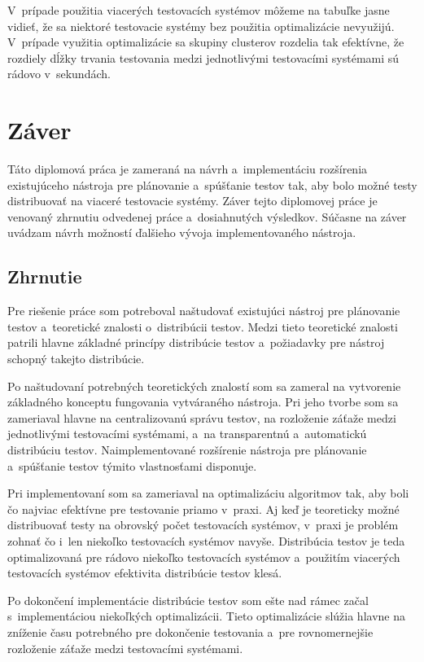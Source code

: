 V~prípade použitia viacerých testovacích systémov môžeme na tabuľke jasne vidieť,
že sa niektoré testovacie systémy bez použitia optimalizácie nevyužijú. 
V~prípade využitia optimalizácie sa skupiny clusterov rozdelia tak efektívne,
že rozdiely dĺžky trvania testovania medzi jednotlivými testovacími systémami 
sú rádovo v~sekundách.


%
%
\chapter{Záver}
\label{kapitola:zaver}
Táto diplomová práca je zameraná na návrh a~implementáciu rozšírenia
existujúceho nástroja pre plánovanie a~spúšťanie testov tak, aby bolo
možné testy distribuovať na viaceré testovacie systémy. 
Záver tejto diplomovej práce je venovaný zhrnutiu odvedenej práce 
a~dosiahnutých výsledkov. Súčasne na záver uvádzam návrh možností ďalšieho
vývoja implementovaného nástroja.

\section{Zhrnutie}
\label{sekcia:zhrnutie}
Pre riešenie práce som potreboval naštudovať existujúci nástroj pre 
plánovanie testov a~teoretické znalosti o~distribúcii testov.
Medzi tieto teoretické znalosti patrili hlavne základné princípy 
distribúcie testov a~požiadavky pre nástroj schopný takejto distribúcie.

Po naštudovaní potrebných teoretických znalostí som sa zameral na vytvorenie
základného konceptu fungovania vytváraného nástroja. Pri jeho tvorbe
som sa zameriaval hlavne na centralizovanú správu testov, na rozloženie 
záťaže medzi jednotlivými testovacími systémami, a~na transparentnú
a~automatickú distribúciu testov. Naimplementované rozšírenie nástroja pre
plánovanie a~spúšťanie testov týmito vlastnosťami disponuje.

Pri implementovaní som sa zameriaval na optimalizáciu algoritmov tak, aby
boli čo najviac efektívne pre testovanie priamo v~praxi. 
Aj keď je teoreticky možné distribuovať testy na obrovský počet
testovacích systémov, v~praxi je problém zohnať čo i~len niekoľko testovacích
systémov navyše. 
Distribúcia testov je teda optimalizovaná pre rádovo niekoľko testovacích 
systémov a~použitím viacerých testovacích systémov efektivita distribúcie
testov klesá. 

Po dokončení implementácie distribúcie testov som ešte nad rámec začal 
s~implementáciou niekoľkých optimalizácii. Tieto optimalizácie slúžia hlavne
na zníženie času potrebného pre dokončenie testovania a~pre rovnomernejšie
rozloženie záťaže medzi testovacími systémami. 

